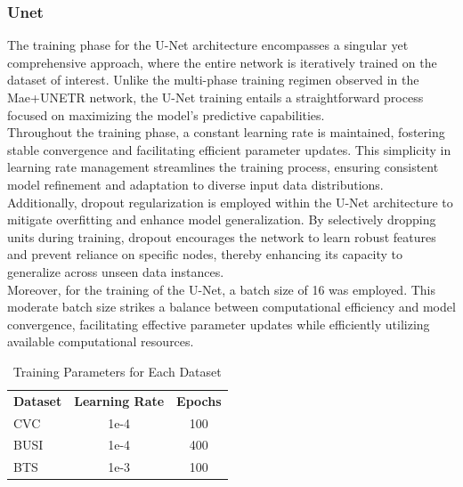 \subsubsection{Unet}
The training phase for the U-Net architecture encompasses a singular yet comprehensive approach, where the entire network is iteratively trained on the dataset of interest. Unlike the multi-phase training regimen observed in the Mae+UNETR network, the U-Net training entails a straightforward process focused on maximizing the model's predictive capabilities.\\

Throughout the training phase, a constant learning rate is maintained, fostering stable convergence and facilitating efficient parameter updates. This simplicity in learning rate management streamlines the training process, ensuring consistent model refinement and adaptation to diverse input data distributions.\\

Additionally, dropout regularization is employed within the U-Net architecture to mitigate overfitting and enhance model generalization. By selectively dropping units during training, dropout encourages the network to learn robust features and prevent reliance on specific nodes, thereby enhancing its capacity to generalize across unseen data instances.\\

Moreover, for the training of the U-Net, a batch size of 16 was employed. This moderate batch size strikes a balance between computational efficiency and model convergence, facilitating effective parameter updates while efficiently utilizing available computational resources.

\begin{table}[H]
\begin{center}
\begin{tabular}{p{2cm}cc}
\textbf{Dataset} & \textbf{Learning Rate} & \textbf{Epochs} \\
CVC  & 1e-4 & 100 \\
BUSI & 1e-4  & 400 \\
BTS  & 1e-3  & 100 \\
\end{tabular}
\caption{Training Parameters for Each Dataset}
\end{center}
\end{table}

